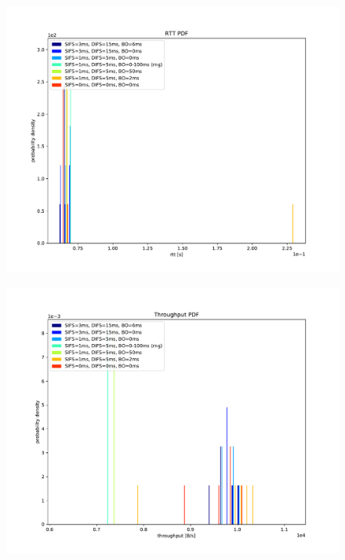 \documentclass{article}
\begin{document}
\begin{figure}
	\includegraphics[width=\textwidth]{pdf/rtt_pdf}
\end{figure}

\begin{figure}
	\includegraphics[width=\textwidth]{pdf/throughput_pdf}
\end{figure}
\end{document}
